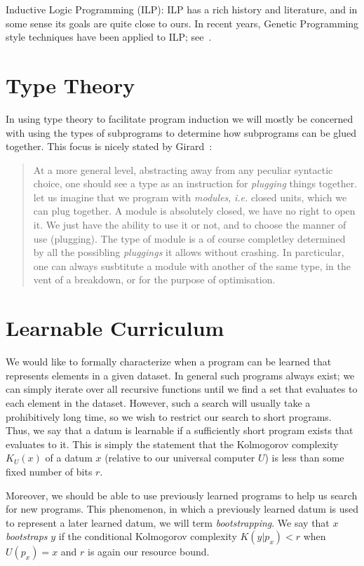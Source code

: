 \documentclass{article}
\begin{document}
Inductive Logic Programming (ILP): ILP has a rich history and
literature, and in some sense its goals are quite close to ours. In
recent years, Genetic Programming style techniques have been applied
to ILP; see~\cite{divina2006evolutionary}.

\section{Type Theory}
In using type theory to facilitate program induction we will mostly be
concerned with using the types of subprograms to determine how
subprograms can be glued together. This focus is nicely stated by Girard~\cite{girard1989proofs}:

\begin{quote}
At a more general level, abstracting away from any peculiar syntactic
choice, one should see a type as an instruction for \emph{plugging}
things together. let us imagine that we program with \emph{modules},
\emph{i.e.} closed units, which we can plug together. A module is
absolutely closed, we have no right to open it. We just have the
ability to use it or not, and to choose the manner of use
(plugging). The type of module is a of course completley determined by
all the possibling \emph{pluggings} it allows without crashing. In
parcticular, one can always susbtitute a module with another of the
same type, in the vent of a breakdown, or for the purpose of
optimisation.
\end{quote}

\section{Learnable Curriculum}
We would like to formally characterize when a program can be learned
that represents elements in a given dataset. In general such programs
always exist; we can simply iterate over all recursive functions until
we find a set that evaluates to each element in the dataset. However,
such a search will usually take a prohibitively long time, so we wish
to restrict our search to short programs.  Thus, we say that a datum
is learnable if a sufficiently short program exists that evaluates to
it. This is simply the statement that the Kolmogorov complexity
$K_U(x)$ of a datum $x$ (relative to our universal computer $U$) is
less than some fixed number of bits $r$. 

Moreover, we should be able to use previously learned programs to help
us search for new programs. This phenomenon, in which a previously
learned datum is used to represent a later learned datum, we will term
\emph{bootstrapping}. We say that $x$ \emph{bootstraps} $y$ if the
conditional Kolmogorov complexity $K(y | p_x) < r$ when $U(p_x) = x$ and
$r$ is again our resource bound. 
\end{document}
